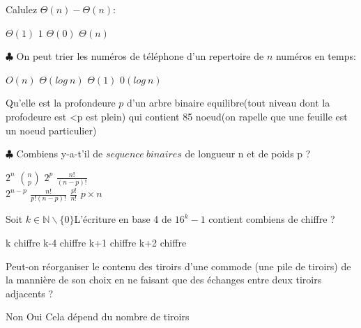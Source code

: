 \documentclass[addpoints]{exam}
\newcommand{\e}{\'{e}}
\begin{document}
\begin{questions}
\question
Calulez $\Theta (n)-\Theta (n)$:

\begin{oneparchoices}
\choice $\Theta(1)$
\choice $1$
\choice $\Theta(0)$
\CorrectChoice $\Theta(n)$
\end{oneparchoices}
\renewcommand\questionlabel{\thequestion.}

\question
$\clubsuit$ On peut trier les num\'{e}ros de t\'{e}l\'{e}phone d'un repertoire de $n$ num\'{e}ros en temps:

\begin{oneparchoices}
\CorrectChoice $O(n)$
\choice $\Theta(log\: n)$
\choice $\Theta(1)$
\choice $0(log\: n)$
\end{oneparchoices}

\question
Qu'elle est la profondeure $p$ d'un arbre binaire equilibre(tout niveau dont la profodeure est <p est plein) qui contient 85 noeud(on rapelle que une feuille est un noeud particulier)

\begin{oneparchoices}
\end{oneparchoices}

\question
$\clubsuit$ Combiens y-a-t'il de $sequence\ binaires$ de longueur n et de poids p ?

\begin{oneparchoices}
\choice $2^n$
\CorrectChoice  $\binom{n}{p}$
\choice $2^p$
\choice $\frac{n!}{(n-p)!}$
\\
\choice $2^{n-p}$
\CorrectChoice  $\frac{n!}{p!(n-p)!}$
\choice $\frac{p!}{n!}$
\choice $p \times n$
\end{oneparchoices}

\question
Soit $k\in \mathbb{N}\backslash\{0\}$L'\e criture en base 4 de $16^k-1$ contient combiens de chiffre ?

\begin{oneparchoices}
\choice k chiffre
\choice k-4 chiffre
\choice k+1 chiffre
\CorrectChoice k+2 chiffre 
\end{oneparchoices}

\question
Peut-on r\e organiser le contenu des tiroirs d'une commode (une pile de tiroirs) de la manni\`{e}re de son choix en ne faisant que des \e changes entre deux tiroirs adjacents ?

\begin{oneparchoices}
\choice Non
\CorrectChoice Oui 
\choice Cela d\e pend du nombre de tiroirs
\end{oneparchoices}


\end{questions}
\end{document}
